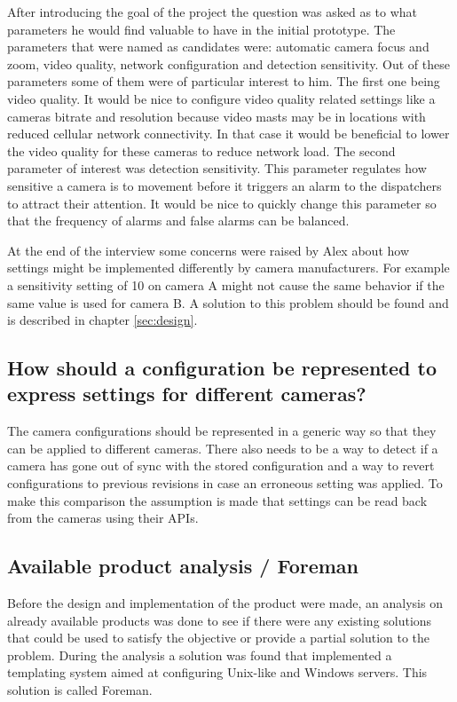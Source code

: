 After introducing the goal of the project the question was asked as to what parameters he would find valuable to have in the initial prototype.
The parameters that were named as candidates were: automatic camera focus and zoom, video quality, network configuration and detection sensitivity.
Out of these parameters some of them were of particular interest to him. The first one being video quality. It would be nice to configure video quality related settings like a
cameras bitrate and resolution because video masts may be in locations with reduced cellular network connectivity. In that case it would be beneficial to lower the video quality
for these cameras to reduce network load. The second parameter of interest was detection sensitivity. This parameter regulates how sensitive a camera is to movement before it
triggers an alarm to the dispatchers to attract their attention. It would be nice to quickly change this parameter so that the frequency of alarms and false alarms can be balanced.


At the end of the interview some concerns were raised by Alex about how settings might be implemented differently by camera manufacturers. For example a sensitivity setting of 10
on camera A might not cause the same behavior if the same value is used for camera B. A solution to this problem should be found and is described in chapter \ref{sec:design}.

\subsection{How should a configuration be represented to express settings for different cameras?}
The camera configurations should be represented in a generic way so that they can be applied to different cameras. There also needs to be a way to detect if a camera
has gone out of sync with the stored configuration and a way to revert configurations to previous revisions in case an erroneous setting was applied. To make this comparison the assumption is made that settings can be read back from the cameras using their APIs.

\subsection{Available product analysis / Foreman}
Before the design and implementation of the product were made, an analysis on already available products was done to see if there were any existing solutions that could be used to satisfy the objective or provide a partial solution to the problem.
During the analysis a solution was found that implemented a templating system aimed at configuring Unix-like and Windows servers.
This solution is called Foreman.


